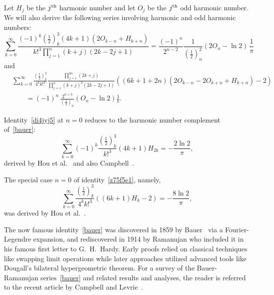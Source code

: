 \documentclass[12pt,reqno]{article}
\begin{document}
Let $H_j$ be the $j^{\rm th}$ harmonic number and let $O_j$ be the $j^{\rm th}$ odd harmonic number. We will also derive the following series involving harmonic and odd harmonic numbers:
\begin{equation}\label{di4jyj5}
\sum_{k = 0}^\infty  {\frac{{( - 1)^k \left( {\frac{1}{2}} \right)_k^3 \left( {4k + 1} \right)\left( {2O_{k - n}  + H_{k + n} } \right)}}{{k!^3 \prod_{j = 1}^n {\left( {k + j} \right)\left( {2k - 2j + 1} \right)} }}}  = \frac{{( - 1)^n }}{{2^{n - 2} }}\frac{1}{{\left( {\frac{1}{2}} \right)_n^2 }}\left( {2O_n  - \ln 2} \right)\,\frac{1}{\pi }
\end{equation}
and
\begin{align}\label{z75f5e1}
&\sum_{k = 0}^\infty  {\frac{{\left( {\frac{1}{2}} \right)_k^3 }}{{4^k k!^3 }}\frac{{\prod_{j = 1}^{2n} {\left( {2k + j} \right)} }}{{\prod_{j = 1}^n {\left( {k + j} \right)^2 \left( {2k - 2j + 1} \right)} }}\left( {\left( {6k + 1 + 2n} \right)\left( {2O_{k - n}  - 2O_{k + n}  + H_{k + n} } \right) - 2} \right)}\nonumber\\
&\qquad  = ( - 1)^n\,\frac{{2^{n + 3} }}{{\left( {\frac{1}{2}} \right)_n }}\left( {O_n  - \ln 2} \right)\frac{1}{\pi }.
\end{align}

Identity~\eqref{di4jyj5} at $n=0$ reduces to the harmonic number complement of~\eqref{bauer}:
\begin{equation}
\sum_{k = 0}^\infty  {( - 1)^k \frac{{\left( {\frac{1}{2}} \right)_k^3 }}{{k!^3 }}\left( {4k + 1} \right)H_{2k} }  =  - \frac{2\ln 2}{\pi },
\end{equation}
derived by Hou et al.~\cite{hou24} and also Campbell~\cite{campbell26}.

The special case $n=0$ of identity~\eqref{z75f5e1}, namely,
\begin{equation}
\sum_{k = 0}^\infty  {\frac{{\left( {\frac{1}{2}} \right)_k^3 }}{{4^k k!^3 }}\left( {\left( {6k + 1} \right)H_k  - 2} \right)}  =  - \frac{{8\ln 2}}{\pi },
\end{equation}
was derived by Hou et al.~\cite{hou24}.

The now famous identity~\eqref{bauer} was discovered in 1859 by Bauer~\cite{bauer} via a Fourier-Legendre expansion, and rediscovered in 1914 by Ramanujan who included it in his famous first letter to G.~H.~Hardy. Early proofs relied on classical techniques like swapping limit operations while later approaches utilized advanced tools like Dougall's bilateral hypergeometric theorem. For a survey of the \mbox{Bauer-Ramanujan} series~\eqref{bauer} and related results and analyses, the reader is referred to the recent article by Campbell and Levrie~\cite{campbell24}.
\end{document}
